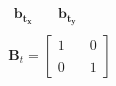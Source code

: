 \documentclass[preview]{standalone}
\begin{document}
\begin{align*}
\begin{array}{c}\begin{matrix}\mathbf{b_{t_x}} & \quad \mathbf{b_{t_y}} \end{matrix} \\\mathbf{B}_t = \begin{bmatrix} 1 & \quad 0 \\ \\0 & \quad 1 \end{bmatrix} \end{array}
\end{align*}
\end{document}
